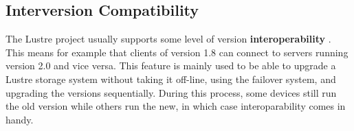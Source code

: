 \subsection{Interversion Compatibility}

The Lustre project usually supports some level of version \textbf{interoperability}
\cite{interoperability}. This means for example that clients of version 1.8 can
connect to servers running version 2.0 and vice versa.
This feature is mainly used to be able to upgrade a Lustre storage system without
taking it off-line, using the failover system, and upgrading the versions
sequentially. During this process, some devices still run the old version while
others run the new, in which case interoparability comes in handy.

